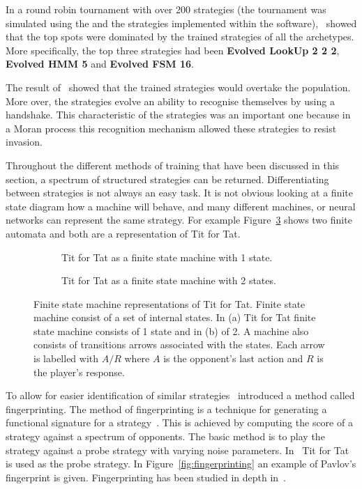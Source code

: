 \documentclass{article}
\theoremstyle{definition}
\begin{document}
In a round robin tournament with over 200 strategies (the tournament was
simulated using the and the strategies implemented within the
software),~\cite{Knight2017} showed that the top spots were dominated by the
trained strategies of all the archetypes. More specifically, the top three
strategies had been \textbf{Evolved LookUp 2 2 2}, \textbf{Evolved HMM 5} and
\textbf{Evolved FSM 16}.

The result of~\cite{KnightHGC17} showed that the trained strategies would
overtake the population. More over, the strategies evolve an ability to
recognise themselves by using a handshake. This characteristic of the strategies
was an important one because in a Moran process this recognition mechanism
allowed these strategies to resist invasion.

Throughout the different methods of training that have been discussed in this
section, a spectrum of structured strategies can be returned. Differentiating
between strategies is not always an easy task. It is not obvious looking at a
finite state diagram how a machine will behave, and many different machines, or
neural networks can represent the same strategy. For example
Figure~\ref{fig:machine_tft} shows two finite automata and both are a
representation of Tit for Tat.


\begin{figure}[!hbtp]
    \begin{subfigure}{.45\textwidth}\centering
        
        \caption{Tit for Tat as a finite state machine with 1 state.}\label{fig:representation_a}
    \end{subfigure}
    \begin{subfigure}{.45\textwidth}\centering
        
        \caption{Tit for Tat as a finite state machine with 2 states.}\label{fig:representation_b}
     \end{subfigure}
     \caption{Finite state machine representations of Tit for Tat. Finite state
     machine consist of a set of internal states. In (a) Tit for Tat finite state
     machine consists of 1 state and in (b) of 2. A machine also consists of transitions
     arrows associated with the states. Each arrow is labelled with \(A/R\) where
     \(A\) is the opponent's last action and \(R\) is the player's response.}\label{fig:machine_tft}
\end{figure}

To allow for easier identification of similar strategies~\cite{Ashlock2005}
introduced a method called fingerprinting. The method of fingerprinting is a
technique for generating a functional signature for a
strategy~\cite{Ashlock2008}. This is achieved by computing the score of a
strategy against a spectrum of opponents. The basic method is to play the
strategy against a probe strategy with varying noise parameters.
In~\cite{Ashlock2005} Tit for Tat is used as the probe strategy. In
Figure~\ref{fig:fingerprinting} an example of Pavlov's fingerprint is given.
Fingerprinting has been studied in depth in~\cite{Ashlock2008, Ashlock2009,
Ashlock2010, Ashlock2006a}.
\end{document}
